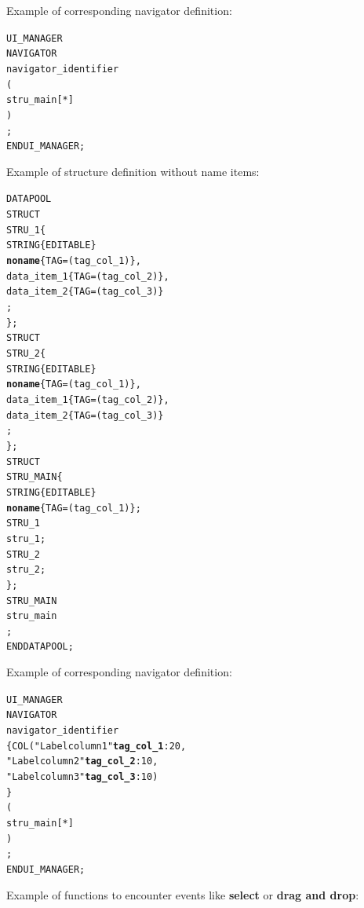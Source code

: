 \vspace{0.5cm}

Example of corresponding navigator definition: \\

\begin{boxedminipage}[t]{\linewidth}
\begin{alltt}
UI_MANAGER
  NAVIGATOR
    navigator_identifier
    (
      stru_main[*]
    )
  ;
END UI_MANAGER;
\end{alltt}
\end{boxedminipage}


\newpage
{}
Example of structure definition without name items: \\


\begin{boxedminipage}[t]{\linewidth}
\begin{alltt}
DATAPOOL
  STRUCT
    STRU\_1 \{
      STRING \{EDITABLE\}
        {\bfseries noname}   \{TAG = (tag_col_1)\},
        data_item_1    \{TAG = (tag_col_2)\},
        data_item_2    \{TAG = (tag_col_3)\}
      ;
    \};
  STRUCT
    STRU_2 \{
      STRING \{EDITABLE\}
        {\bfseries noname}   \{TAG = (tag_col_1)\},
        data_item_1    \{TAG = (tag_col_2)\},
        data_item_2    \{TAG = (tag_col_3)\}
      ;
    \};
  STRUCT
    STRU_MAIN \{
      STRING \{EDITABLE\}
        {\bfseries noname}   \{TAG = (tag_col_1)\};
      STRU_1
        stru_1;
      STRU_2
        stru_2;
    \};
  STRU_MAIN
    stru_main
  ;
END DATAPOOL;
\end{alltt}
\end{boxedminipage}

\vspace{0.5cm}

Example of corresponding navigator definition: \\

\begin{boxedminipage}[t]{\linewidth}
\begin{alltt}
UI_MANAGER
  NAVIGATOR
    navigator_identifier
    \{ COL ("Label column1" {\bfseries tag\_col\_1}:20,
            "Label column2" {\bfseries tag\_col\_2}:10,
            "Label column3" {\bfseries tag\_col\_3}:10)
    \}
    (
      stru_main[*]
    )
  ;
END UI_MANAGER;
\end{alltt}
\end{boxedminipage}


\newpage
\label{navigatordragndrop}
Example of functions to encounter events like {\bfseries select} or {\bfseries drag and drop}:

